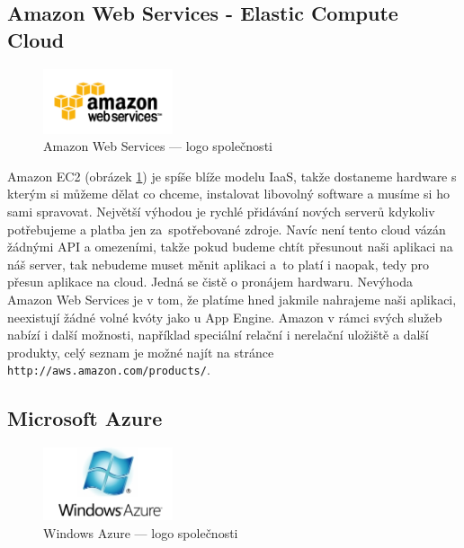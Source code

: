 \subsection{Amazon Web Services - Elastic Compute Cloud}

\begin{figure}[h]
\begin{center}
\includegraphics[width=1.5in]{figures/aws-logo.png}
\caption[Amazon Web Services]{Amazon Web Services --- logo společnosti}
\label{fig:aws-logo}
\end{center}
\end{figure}

Amazon EC2 (obrázek \ref{fig:aws-logo}) je spíše blíže modelu IaaS, takže dostaneme hardware s kterým si můžeme dělat co chceme, instalovat libovolný software a musíme si ho sami spravovat. Největší výhodou je rychlé přidávání nových serverů kdykoliv potřebujeme a platba jen za~spotřebované zdroje. Navíc není tento cloud vázán žádnými API a omezeními, takže pokud budeme chtít přesunout naši aplikaci na náš server, tak nebudeme muset měnit aplikaci a~to platí i naopak, tedy pro přesun aplikace na cloud. Jedná se čistě o pronájem hardwaru. Nevýhoda Amazon Web Services je v tom, že platíme hned jakmile nahrajeme naši aplikaci, neexistují žádné volné kvóty jako u App Engine. Amazon v rámci svých služeb nabízí i další možnosti, například speciální relační i nerelační uložiště a další produkty, celý seznam je možné najít na stránce \verb|http://aws.amazon.com/products/|. 

\subsection{Microsoft Azure}

\begin{figure}[h]
\begin{center}
\includegraphics[width=1.5in]{figures/azure-logo.jpg}
\caption[Windows Azure]{Windows Azure --- logo společnosti}
\label{fig:azure-logo}
\end{center}
\end{figure}

